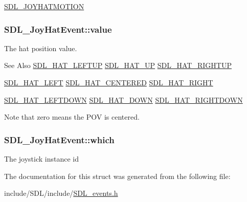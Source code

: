 \hyperlink{_s_d_l__events_8h_a3b589e89be6b35c02e0dd34a55f3fccaafba4080bfbad335e520097b2024f0dff}{S\-D\-L\-\_\-\-J\-O\-Y\-H\-A\-T\-M\-O\-T\-I\-O\-N} \hypertarget{struct_s_d_l___joy_hat_event_a52b179a34407449941b61d988ca72ef4}{
\subsubsection[{value}]{ S\-D\-L\-\_\-\-Joy\-Hat\-Event\-::value}}\label{struct_s_d_l___joy_hat_event_a52b179a34407449941b61d988ca72ef4}
The hat position value. \begin{DoxySeeAlso}{See Also}
\hyperlink{_s_d_l__joystick_8h_a6d7988b43c09ced08ec318a2556f1858}{S\-D\-L\-\_\-\-H\-A\-T\-\_\-\-L\-E\-F\-T\-U\-P} \hyperlink{_s_d_l__joystick_8h_ac916fe96c0740790e5496e12c67d8889}{S\-D\-L\-\_\-\-H\-A\-T\-\_\-\-U\-P} \hyperlink{_s_d_l__joystick_8h_a65fde978b4ab9c269c215d1922ae7755}{S\-D\-L\-\_\-\-H\-A\-T\-\_\-\-R\-I\-G\-H\-T\-U\-P} 

\hyperlink{_s_d_l__joystick_8h_a4666c12cae25d8bab053d8569396cd77}{S\-D\-L\-\_\-\-H\-A\-T\-\_\-\-L\-E\-F\-T} \hyperlink{_s_d_l__joystick_8h_adbfd6f0bad25cd1bb79f8c0a065f3833}{S\-D\-L\-\_\-\-H\-A\-T\-\_\-\-C\-E\-N\-T\-E\-R\-E\-D} \hyperlink{_s_d_l__joystick_8h_a5d1844afaf2ceaf58c689a8bd480a543}{S\-D\-L\-\_\-\-H\-A\-T\-\_\-\-R\-I\-G\-H\-T} 

\hyperlink{_s_d_l__joystick_8h_a3fa8609d382a0f74507890491033c784}{S\-D\-L\-\_\-\-H\-A\-T\-\_\-\-L\-E\-F\-T\-D\-O\-W\-N} \hyperlink{_s_d_l__joystick_8h_aa87f7a91d6bae8b420b133559d983338}{S\-D\-L\-\_\-\-H\-A\-T\-\_\-\-D\-O\-W\-N} \hyperlink{_s_d_l__joystick_8h_abf50339da11ca12699ee2199607d275f}{S\-D\-L\-\_\-\-H\-A\-T\-\_\-\-R\-I\-G\-H\-T\-D\-O\-W\-N}
\end{DoxySeeAlso}
Note that zero means the P\-O\-V is centered. \hypertarget{struct_s_d_l___joy_hat_event_ac9d9bb179f9116d16b3da47cacd74b55}{
\subsubsection[{which}]{ S\-D\-L\-\_\-\-Joy\-Hat\-Event\-::which}}\label{struct_s_d_l___joy_hat_event_ac9d9bb179f9116d16b3da47cacd74b55}
The joystick instance id 

The documentation for this struct was generated from the following file\-:\begin{DoxyCompactItemize}
\item 
include/\-S\-D\-L/include/\hyperlink{_s_d_l__events_8h}{S\-D\-L\-\_\-events.\-h}\end{DoxyCompactItemize}

